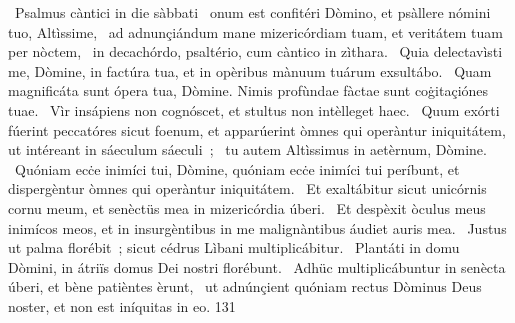 {~Psalmus càntici in die sàbbati}
{%
~onum est confitéri Dòmino, et psàllere nómini tuo, Altìssime,
~ad adnunçiándum mane mizericórdiam tuam, et veritátem tuam per nòctem,
~in decachórdo, psaltério, cum càntico in zìthara.
~Quia delectavìsti me, Dòmine, in factúra tua, et in opèribus mànuum tuárum exsultábo.
~Quam magnificáta sunt ópera tua, Dòmine. Nimis profùndae fàctae sunt coġitaçiónes tuae.
~Vìr insápiens non cognóscet, et stultus non intèlleget haec.
~Quum exórti fúerint peccatóres sicut foenum, et apparúerint òmnes qui operàntur iniquitátem, ut intéreant in sáeculum sáeculi~;
~tu autem Altìssimus in aetèrnum, Dòmine.
~Quóniam ecċe inimíci tui, Dòmine, quóniam ecċe inimíci tui períbunt, et dispergèntur òmnes qui operàntur iniquitátem.
~Et exaltábitur sicut unicórnis cornu meum, et senèctüs mea in mizericórdia úberi.
~Et despèxit òculus meus inimícos meos, et in insurgèntibus in me malignàntibus áudiet auris mea.
~Justus ut palma florébit~; sicut cédrus Lìbani multiplicábitur.
~Plantáti in domu Dòmini, in átriïs domus Dei nostri florébunt.
~Adhüc multiplicábuntur in senècta úberi, et bène patièntes èrunt,
~ut adnúnçient quóniam rectus Dòminus Deus noster, et non est iníquitas in eo.
}
{13}{1}
